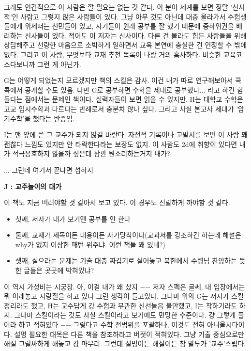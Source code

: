 그래도 인간적으로 이 사람은 깔 필요는 없는 것 같다.
이 분야 세계를 보면 정말 '신사적'인 사람고 그렇지 않은 사람들이 있다.
그냥 아무 것도 아닌데 대충 올라가서 수험생들에게 위세떠는 천민들이 있고,
자기들이 원래 공부를 잘 했기 때문에 중하위권을 배려하는 신사들이 있다. 적어도 이 저자는 신사이다.
다른 건 몰라도 힘든 사람들을 위해 상담해주고 선량한 마음으로 소박하게 일하면서 교육 본연에 충실한 건 인정할 수 밖에 없다.
그리고 이 사람, 무엇보다 교재 추천 목록이 나랑 거의 흡사하다. 비슷한 교육코스다보니까 그런 게 아닌가.
\vspace{5mm}

G는 어떻게 되었는지 모르겠지만 책의 스킬은 감사. 이건 내가 따로 연구해보아서 콕콕에서 공개할 수도 있음.
다만 G로 공부하면 수학을 제대로 공부했다... 라고 하긴 힘들다는 점에서는 문제인 책이다. 실력자들이 보면 읽을 수 있지만.
H는 대학교 수학은 고교 입시수학과 다르다는 반례로서 충분치 않나 싶다.
그리고 사실 본고사 세대가 '암기수학'을 했다는 반증임.
\vspace{5mm}

I는 맨 앞에 쓴 그 교주가 되지 않길 바란다.
자전적 기록이나 고발서를 보면 이 사람 꽤 괜찮다 느낌도 있지만 안 타락한다라는 보장도 없지.
이 사람도 2d에 취향이 있다면 내가 적극옹호하지 않을까 싶은데 잠깐 뭔소리하는거지 내가?
\vspace{5mm}

... 그런데 여기서 끝나면 섭하지
\vspace{5mm}

\textbf{J : 교주놀이의 대가}
\vspace{5mm}

이 책도 지금 버려야할 것 같아서 보고 있다.
이 경우도 신랄하게 까야할 것 같다.
\vspace{5mm}

\begin{itemize}
    \item 첫째, 저자가 내가 보기엔 공부를 안 한다
    \item 둘째, 교재가 제목이든 내용이든 자가당착이다(교과서를 강조하긴 하는데 해설은 why가 없지 이상한 패턴 위주냐. 이런 책들 꽤 있네?)
    \item 셋째, 실으라는 문제는 기출 대충 짜깁기로 실어놓고 북한에서 수령님 찬양하는 듯한 글들은 곳곳에 박혀있냐?
\end{itemize}
\vspace{5mm}

이 역시 가성비는 시궁창. 아, 이걸 내가 왜 샀지 $-$$-$
저자 스펙은 글쎄, 내 입장에서는 뭐 이래놓고 자랑질을 하고 있냐 그런 생각이 들고있다.
그나마 위의 G는 저자가 스킬 정리라도 했고, H는 교수답게 걍 수험과 무관한 신선놀음 볼만했고, I는 착하기라도 하지.
그나마 스킬이라는 것도 사실 스킬이라고 보기에도 민망한 수준이다. 걍 그렇게 풀어라 하고 적혀있다 $-$$-$
그렇다고 수학 전범위를 포괄하나, 이것도 전혀 아니올시다이다. 설명 필요한 대목은 다른 책을 참조하라고 버젓이 적혀있다.
그냥 기출 중심으로만 해설 그럴싸하게 해놓고 걍 마무리. 그런데 설명이든 해설이든 참 말투가 '교주'스럽다.
\vspace{5mm}

